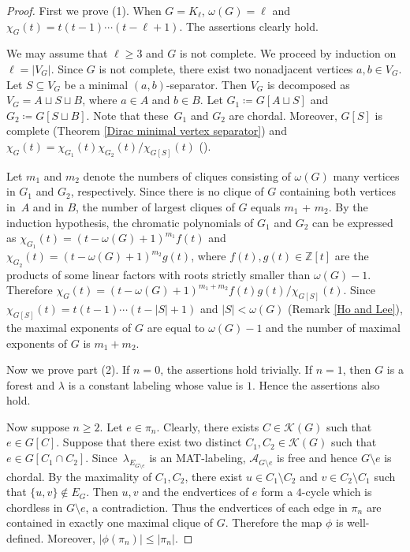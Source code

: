 \documentclass[ALCO, Unicode,published]{cedram}
\newcommand{\mcK}{\mathcal{K}}
\begin{document}
\begin{proof}
First we prove (1).
When $ G = K_{\ell} $, $ \omega(G) = \ell $ and $ \chi_{G}(t) = t(t-1) \cdots (t-\ell+1) $. 
The assertions clearly hold. 

We may assume that $ \ell \geq 3 $ and $ G $ is not complete. 
We proceed by induction on~$ \ell = |V_{G}| $. 
Since $ G $ is not complete, there exist two nonadjacent vertices $ a,b \in V_{G} $. 
Let $ S \subseteq V_{G} $ be a minimal $ (a,b) $-separator. 
Then $ V_{G} $ is decomposed as $ V_{G} = A \sqcup S \sqcup B $, where $ a \in A $ and $ b \in B $. 
Let $ G_{1} \coloneqq G[A\sqcup S] $ and $ G_{2} \coloneqq G[S \sqcup B] $. 
Note that these~$ G_{1} $ and $ G_{2} $ are chordal. 
Moreover, $ G[S] $ is complete (Theorem \ref{Dirac minimal vertex separator}) and $ \chi_{G}(t) = \chi_{G_{1}}(t)\chi_{G_{2}}(t)/\chi_{G[S]}(t) $ (\eg  \cite[Theorem 3]{Read68}). 

Let $ m_{1} $ and $ m_{2} $ denote the numbers of cliques consisting of $ \omega(G) $ many vertices in $ G_{1} $ and $ G_{2} $, respectively. 
Since there is no clique of $ G $ containing both vertices in~$ A $ and in $ B $, the number of largest cliques of $ G $ equals $ m_{1} $ + $ m_{2} $. 
By the induction hypothesis, the chromatic polynomials of $ G_{1} $ and $ G_{2} $ can be expressed as $ \chi_{G_{1}}(t)  = (t-\omega(G)+1)^{m_{1}} f(t) $ and $ \chi_{G_{2}}(t) = (t-\omega(G)+1)^{m_{2}}g(t) $, where $ f(t), g(t) \in \mathbb{Z}[t] $ are the products of some linear factors with roots strictly smaller than $ \omega(G) -1$. 
Therefore $ \chi_{G}(t) = (t-\omega(G)+1)^{m_{1}+m_{2}}f(t)g(t)/\chi_{G[S]}(t) $. 
Since $ \chi_{G[S]}(t) = t(t-1) \cdots (t-|S|+1) $ and $ |S| < \omega(G) $ (Remark \ref{Ho and Lee}), the maximal exponents of $ G $ are equal to $ \omega(G)-1 $  and the number of maximal exponents of $ G $ is $ m_{1} + m_{2} $. 

Now we prove part (2). If $ n = 0 $, the assertions hold trivially. 
If $ n = 1 $, then $ G $ is a forest and $ \lambda $ is a constant labeling whose value is $ 1 $. 
Hence the assertions also hold. 

Now suppose $ n \geq 2 $. 
Let $ e \in \pi_{n} $. 
Clearly, there exists $ C\in \mcK(G)$ such that $e \in G[C]$.
Suppose that there exist two distinct $ C_{1} ,C_{2} \in \mcK(G)$ such that $ e\in G[C_{1} \cap C_{2}] $. 
Since~$ \lambda_{E_{G \setminus e}} $ is an MAT-labeling, $ \mathcal{A}_{G\setminus e} $ is free and hence $ G\setminus e $ is chordal. 
By the maximality of $ C_{1} ,C_{2}$, there exist $u\in C_{1}\setminus C_{2} $ and $v\in C_{2}\setminus C_{1} $ such that $\{u,v\} \notin E_G$.
Then $u,v$ and the endvertices of $ e$ form a $4$-cycle  which is chordless in $ G\setminus e $, a contradiction. 
Thus the endvertices of each edge in $ \pi_{n} $ are contained in exactly one maximal clique of $ G $.
Therefore the map $\phi$ is well-defined. Moreover, $ |\phi(\pi_{n})| \leq  |\pi_{n}|  $. 


\end{proof}
\end{document}
